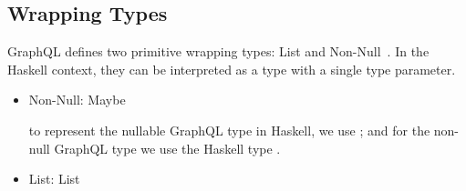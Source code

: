 \subsection{Wrapping Types}
\begin{frame}

GraphQL defines two primitive wrapping types: List and Non-Null~\cite{gql-spec}. In the Haskell context, they can be interpreted as a type with a single type parameter.
\begin{itemize}

  \item Non-Null: Maybe

    to represent the nullable GraphQL type  in Haskell, we use ; and for the non-null GraphQL type  we use the Haskell type .

  \item List: List
\end{itemize}

\end{frame}

